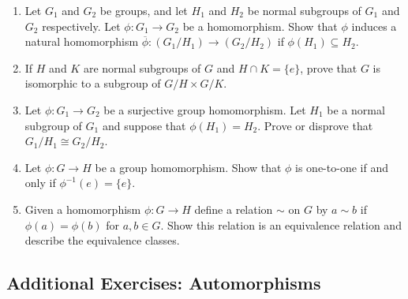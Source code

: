 {\begin{enumerate}
 
\item
Let $G_1$ and $G_2$ be groups, and let $H_1$ and $H_2$ be normal subgroups
of $G_1$ and $G_2$ respectively. Let $\phi : G_1 \rightarrow G_2$ be a
homomorphism. Show that $\phi$ induces a natural homomorphism
$\overline{\phi} : (G_1/H_1) \rightarrow (G_2/H_2)$ if $\phi(H_1) \subseteq
H_2$. 
 
 
\item
If $H$ and $K$ are normal subgroups of $G$ and $H \cap K = \{ e \}$,
prove that $G$ is isomorphic to a subgroup of $G/H \times G/K$.
 
 
 
\item
Let $\phi : G_1 \rightarrow G_2$ be a surjective group homomorphism.
Let $H_1$ be a normal subgroup of $G_1$ and suppose that $\phi(H_1) =
H_2$.  Prove or disprove that $G_1/H_1 \cong G_2/H_2$.
 
 
\item
Let $\phi : G \rightarrow H$ be a group homomorphism.  Show that
$\phi$ is one-to-one if and only if $\phi^{-1}(e) = \{ e \}$.

\item
Given a homomorphism $\phi :G \rightarrow H$ define a relation $\sim$ on $G$ by $a \sim b$ if $\phi(a) = \phi(b)$ for $a, b \in G$.  Show this relation is an equivalence relation and describe the equivalence classes. 



\end{enumerate}
}
 


\subsection*{Additional Exercises: Automorphisms}
 

